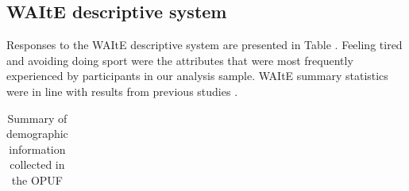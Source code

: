 \documentclass[
  number,
  preprint]{elsarticle}
\begin{document}
\subsection{WAItE descriptive system}\label{waite-descriptive-system}

Responses to the WAItE descriptive system are presented in Table
\citep{tab-demographic}. Feeling tired and avoiding doing sport were the
attributes that were most frequently experienced by participants in our
analysis sample. WAItE summary statistics were in line with results from
previous studies \citep{Robinson2019EstimatingEvaluation}.

\begin{longtable}[]{@{}ll@{}}

\caption{\label{tbl-demographic}Summary of demographic information
collected in the OPUF}

\tabularnewline


\end{longtable}
\end{document}
